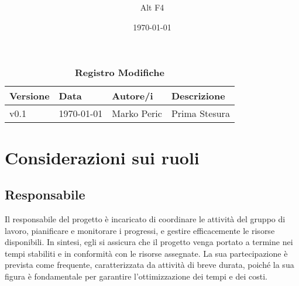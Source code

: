 \documentclass[a4paper, 12pt]{article}
\title{\Huge \textbf{\titolo}}
\author{\Large{Alt} \raisebox{0.3ex}{\normalsize  +} \Large{F4}}
\date{\today}
\def\logo{Immagini/logo.jpeg}
\def\ultima-versione{v0.1}
\begin{document}
\begin{titlepage}      
    \maketitle
    \thispagestyle{empty}  

\end{titlepage}
\tableofcontents

\newpage

\begin{table}[!h]
    \centering
    \caption*{\textbf{\Large Registro Modifiche}}
    {\renewcommand{\arraystretch}{2}
    \begin{tabularx}{\textwidth}{| X | X | X | X |}
        \hline
            \textbf{\large Versione} & 
            \textbf{\large Data} & 
            \textbf{\large Autore/i} & 
            \textbf{\large Descrizione} \\ 
        \hline \hline
            \ultima-versione & 
            \today & 
            Marko Peric & 
            Prima Stesura \\
        \hline 
    \end{tabularx}}
\end{table}

\newpage

\section{Considerazioni sui ruoli}
\subsection{Responsabile}
Il responsabile del progetto è incaricato di coordinare le attività del gruppo di lavoro, pianificare e monitorare i progressi, e gestire efficacemente le risorse disponibili. 
In sintesi, egli si assicura che il progetto venga portato a termine nei tempi stabiliti e in conformità con le risorse assegnate. La sua partecipazione è prevista come frequente, caratterizzata da attività di breve durata,
poiché la sua figura è fondamentale per garantire l’ottimizzazione dei tempi e dei costi.
\end{document}
